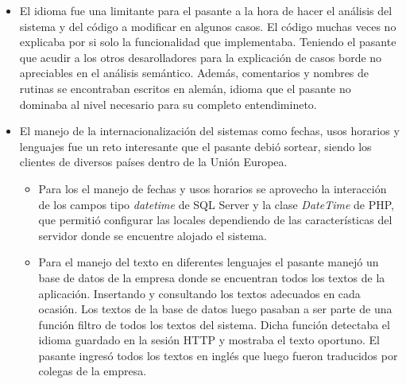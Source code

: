 \begin{itemize}
	\item El idioma fue una limitante para el pasante a la hora de hacer el análisis del sistema y del código a modificar en algunos casos. El código muchas veces no explicaba por si solo la funcionalidad que implementaba. Teniendo el pasante que acudir a los otros desarolladores para la explicación de casos borde no apreciables en el análisis semántico. Además, comentarios y nombres de rutinas se encontraban escritos en alemán, idioma que el pasante no dominaba al nivel necesario para su completo entendimineto.

	\item El manejo de la internacionalización del sistemas como fechas, usos horarios y lenguajes fue un reto interesante que el pasante debió sortear, siendo los clientes de diversos países dentro de la Unión Europea. 
	
	\begin{itemize}
		\item Para los el manejo de fechas y usos horarios se aprovecho la interacción de los campos tipo \emph{datetime} de SQL Server y la clase \emph{DateTime} de PHP, que permitió configurar las locales dependiendo de las características del servidor donde se encuentre alojado el sistema.

		\item Para el manejo del texto en diferentes lenguajes el pasante manejó un base de datos de la empresa donde se encuentran todos los textos de la aplicación. Insertando y consultando los textos adecuados en cada ocasión. Los textos de la base de datos luego pasaban a ser parte de una función filtro de todos los textos del sistema. Dicha función detectaba el idioma guardado en la sesión HTTP y mostraba el texto oportuno. El pasante ingresó todos los textos en inglés que luego fueron traducidos por colegas de la empresa.
	\end{itemize}

\end{itemize}





